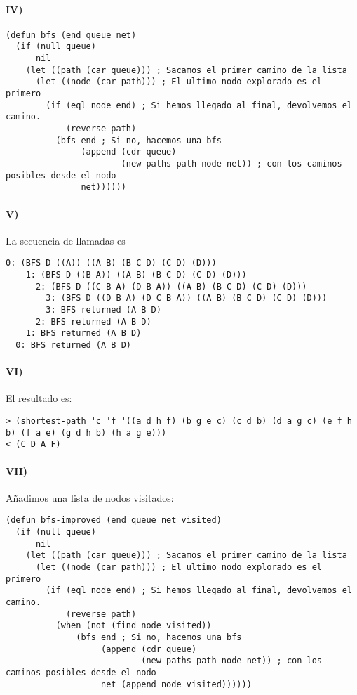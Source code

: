 \documentclass{aitemplate}
\begin{document}
\paragraph{IV)}

\begin{lstlisting}
(defun bfs (end queue net) 
  (if (null queue) 
      nil
    (let ((path (car queue))) ; Sacamos el primer camino de la lista
      (let ((node (car path))) ; El ultimo nodo explorado es el primero
        (if (eql node end) ; Si hemos llegado al final, devolvemos el camino.
            (reverse path)
          (bfs end ; Si no, hacemos una bfs
               (append (cdr queue)
                       (new-paths path node net)) ; con los caminos posibles desde el nodo
               net))))))
\end{lstlisting}

\paragraph{V)}

La secuencia de llamadas es

\begin{verbatim}
0: (BFS D ((A)) ((A B) (B C D) (C D) (D)))
    1: (BFS D ((B A)) ((A B) (B C D) (C D) (D)))
      2: (BFS D ((C B A) (D B A)) ((A B) (B C D) (C D) (D)))
        3: (BFS D ((D B A) (D C B A)) ((A B) (B C D) (C D) (D)))
        3: BFS returned (A B D)
      2: BFS returned (A B D)
    1: BFS returned (A B D)
  0: BFS returned (A B D)
\end{verbatim}

\paragraph{VI)}

El resultado es:

\begin{verbatim}
> (shortest-path 'c 'f '((a d h f) (b g e c) (c d b) (d a g c) (e f h b) (f a e) (g d h b) (h a g e)))
< (C D A F)
\end{verbatim}

\paragraph{VII)}

Añadimos una lista de nodos visitados:

\begin{lstlisting}
(defun bfs-improved (end queue net visited) 
  (if (null queue) 
      nil
    (let ((path (car queue))) ; Sacamos el primer camino de la lista
      (let ((node (car path))) ; El ultimo nodo explorado es el primero
        (if (eql node end) ; Si hemos llegado al final, devolvemos el camino.
            (reverse path)
          (when (not (find node visited))
	          (bfs end ; Si no, hacemos una bfs
	               (append (cdr queue)
	                       (new-paths path node net)) ; con los caminos posibles desde el nodo
	               net (append node visited))))))
\end{lstlisting}
\end{document}

